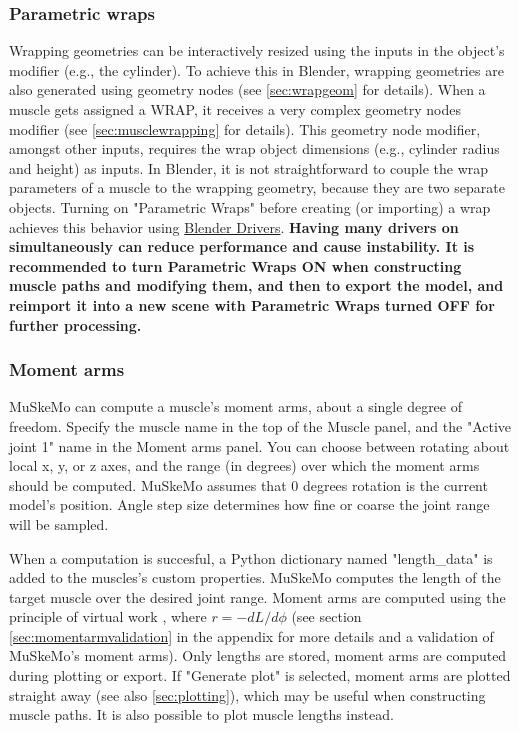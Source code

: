 \documentclass{article}
\begin{document}
\subsubsection{Parametric wraps}
Wrapping geometries can be interactively resized using the inputs in the object's modifier (e.g., the cylinder). To achieve this in Blender, wrapping geometries are also generated using geometry nodes (see \ref{sec:wrapgeom} for details). When a muscle gets assigned a WRAP, it receives a very complex geometry nodes modifier (see \ref{sec:musclewrapping} for details). This geometry node modifier, amongst other inputs, requires the wrap object dimensions (e.g., cylinder radius and height) as inputs. In Blender, it is not straightforward to couple the wrap parameters of a muscle to the wrapping geometry, because they are two separate objects. Turning on "Parametric Wraps" before creating (or importing) a wrap achieves this behavior using \href{https://docs.blender.org/manual/en/latest/animation/drivers/introduction.html}{Blender Drivers}. \textbf{Having many drivers on simultaneously can reduce performance and cause instability. It is recommended to turn Parametric Wraps ON when constructing muscle paths and modifying them, and then to export the model, and reimport it into a new scene with Parametric Wraps turned OFF for further processing.}


\subsubsection{Moment arms}

MuSkeMo can compute a muscle's moment arms, about a single degree of freedom. Specify the muscle name in the top of the Muscle panel, and the "Active joint 1"  name in the Moment arms panel. You can choose between rotating about local x, y, or z axes, and the range (in degrees) over which the moment arms should be computed. MuSkeMo assumes that 0 degrees rotation is the current model's position. Angle step size determines how fine or coarse the joint range will be sampled. 

When a computation is succesful, a Python dictionary named "length\_data" is added to the muscles's custom properties. MuSkeMo computes the length of the target muscle over the desired joint range. Moment arms are computed using the principle of virtual work \cite{storaceFunctionalAnalysisRole1979,anDeterminationMuscleOrientations1984}, where \(r = -dL / d\phi \) (see section \ref{sec:momentarmvalidation} in the appendix for more details and a validation of MuSkeMo's moment arms). Only lengths are stored, moment arms are computed during plotting or export. If "Generate plot" is selected, moment arms are plotted straight away (see also \ref{sec:plotting}), which may be useful when constructing muscle paths. It is also possible to plot muscle lengths instead.
\end{document}
